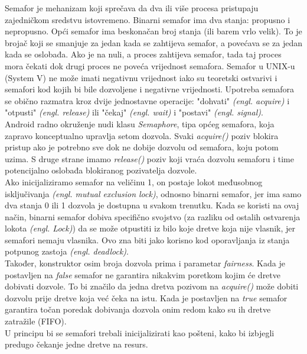 \documentclass[times, utf8, zavrsni]{fer}
\begin{document}
Semafor je mehanizam koji sprečava da dva ili više procesa pristupaju zajedničkom sredstvu istovremeno. Binarni semafor ima dva stanja: propusno i nepropusno. Opći semafor ima beskonačan broj stanja (ili barem vrlo velik). To je brojač koji se smanjuje za jedan kada se zahtijeva semafor, a povećava se za jedan kada se oslobađa. Ako je na nuli, a proces zahtijeva semafor, tada taj proces mora čekati dok drugi proces ne poveća vrijednost semafora. Semafor u UNIX-u (System V) ne može imati negativnu vrijednost iako su teoretski ostvarivi i semafori kod kojih bi bile dozvoljene i negativne vrijednosti. Upotreba semafora se obično razmatra kroz dvije jednostavne operacije: "dohvati" \textit{(engl. acquire)} i "otpusti" \textit{(engl. release)} ili "čekaj" \textit{(engl. wait)} i "postavi" \textit{(engl. signal)}.\\

Android radno okruženje nudi klasu \textit{Semaphore}, tipa općeg semafora, koja zapravo konceptualno upravlja setom dozvola. Svaki \textit{acquire()} poziv blokira pristup ako je potrebno sve dok ne dobije dozvolu od semafora, koju potom uzima. S druge strane imamo \textit{release()} poziv koji vraća dozvolu semaforu i time potencijalno oslobađa blokiranog pozivatelja dozvole.\\

Ako inicijaliziramo semafor na veličinu 1, on postaje lokot međusobnog isključivanja \textit{(engl. mutual exclusion lock)}, odnosno binarni semafor, jer ima samo dva stanja 0 ili 1 dozvola je dostupna u svakom trenutku. Kada se koristi na ovaj način, binarni semafor dobiva specifično svojstvo (za razliku od ostalih ostvarenja lokota \textit{(engl. Lock)}) da se može otpustiti iz bilo koje dretve koja nije vlasnik, jer semafori nemaju vlasnika. Ovo zna biti jako korisno kod oporavljanja iz stanja potpunog zastoja \textit{(engl. deadlock)}.\\

Također, konstruktor osim broja dozvola prima i parametar \textit{fairness}. Kada je postavljen na \textit{false} semafor ne garantira nikakvim poretkom kojim će dretve dobivati dozvole. To bi značilo da jedna dretva pozivom na \textit{acquire()} može dobiti dozvolu prije dretve koja već čeka na istu. Kada je postavljen na \textit{true} semafor garantira točan poredak dobivanja dozvola onim redom kako su ih dretve zatražile (FIFO).\\

U principu bi se semafori trebali inicijalizirati kao pošteni, kako bi izbjegli predugo čekanje jedne dretve na resurs.
\end{document}
